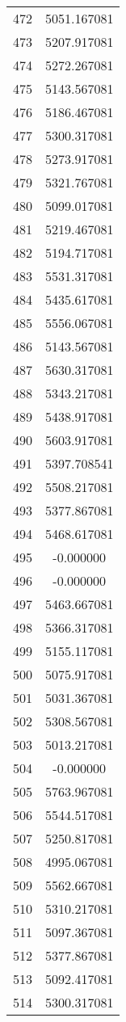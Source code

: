\documentclass[12pt]{article}
\begin{document}
\begin{longtable}{@{}cc@{}}
472 & 5051.167081 \\
473 & 5207.917081 \\
474 & 5272.267081 \\
475 & 5143.567081 \\
476 & 5186.467081 \\
477 & 5300.317081 \\
478 & 5273.917081 \\
479 & 5321.767081 \\
480 & 5099.017081 \\
481 & 5219.467081 \\
482 & 5194.717081 \\
483 & 5531.317081 \\
484 & 5435.617081 \\
485 & 5556.067081 \\
486 & 5143.567081 \\
487 & 5630.317081 \\
488 & 5343.217081 \\
489 & 5438.917081 \\
490 & 5603.917081 \\
491 & 5397.708541 \\
492 & 5508.217081 \\
493 & 5377.867081 \\
494 & 5468.617081 \\
495 & -0.000000 \\
496 & -0.000000 \\
497 & 5463.667081 \\
498 & 5366.317081 \\
499 & 5155.117081 \\
500 & 5075.917081 \\
501 & 5031.367081 \\
502 & 5308.567081 \\
503 & 5013.217081 \\
504 & -0.000000 \\
505 & 5763.967081 \\
506 & 5544.517081 \\
507 & 5250.817081 \\
508 & 4995.067081 \\
509 & 5562.667081 \\
510 & 5310.217081 \\
511 & 5097.367081 \\
512 & 5377.867081 \\
513 & 5092.417081 \\
514 & 5300.317081 \\

\end{longtable}
\end{document}
